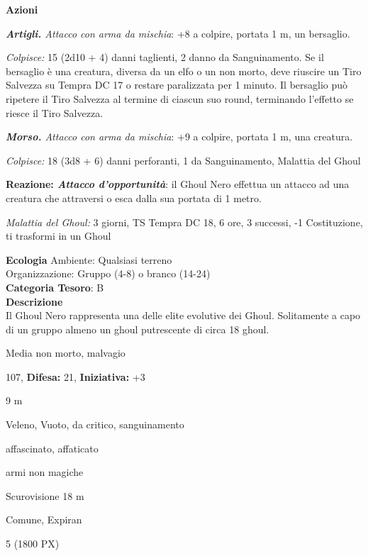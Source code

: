\begin{multicols}{2}
{\textbf{Azioni}

\emph{\textbf{Artigli.} Attacco con arma da mischia}: +8 a colpire, portata 1 m, un bersaglio.

\emph{Colpisce:} 15 (2d10 + 4) danni taglienti, 2 danno da Sanguinamento. Se il bersaglio è una creatura, diversa da un elfo o un non morto, deve riuscire un Tiro Salvezza su Tempra DC 17 o restare paralizzata per 1 minuto. Il bersaglio può ripetere il Tiro Salvezza al termine di ciascun suo round, terminando l'effetto se riesce il Tiro Salvezza.

\emph{\textbf{Morso.} Attacco con arma da mischia}: +9 a colpire, portata 1 m, una creatura.

\emph{Colpisce:} 18 (3d8 + 6) danni perforanti, 1 da Sanguinamento, Malattia del Ghoul

\textbf{Reazione: \emph{Attacco d'opportunità}}: il Ghoul Nero effettua un attacco ad una creatura che attraversi o esca dalla sua portata di 1 metro.

\emph{Malattia del Ghoul:} 3 giorni, TS Tempra DC 18, 6 ore, 3 successi, -1 Costituzione, ti trasformi in un Ghoul

\textbf{Ecologia}
Ambiente: Qualsiasi terreno\\
Organizzazione: Gruppo (4-8) o branco (14-24)\\
\textbf{Categoria Tesoro}: B\\
\textbf{Descrizione}\\
Il Ghoul Nero rappresenta una delle elite evolutive dei Ghoul. Solitamente a capo di un gruppo almeno un ghoul putrescente di circa 18 ghoul.


\noindent
\begin{description}[noitemsep, topsep=0pt, parsep=0pt, partopsep=0pt, leftmargin=0cm, labelwidth=2.2cm]
	\item[\textbf{Taglia/Tipo:}] Media non morto, malvagio
	\item[\textbf{Caratt.:}] 
	\item[\textbf{Punti Ferita:}] 107,  \textbf{Difesa:} 21,  \textbf{Iniziativa:} +3
	\item[\textbf{Movimento:}] 9 m
	\item[\textbf{Tiri Salvez.:}] 
	\item[\textbf{Imm. Danni:}] Veleno, Vuoto, da critico, sanguinamento
	\item[\textbf{Immunità:}] affascinato, affaticato
	\item[\textbf{Res. Danni:}] armi non magiche
	\item[\textbf{Sensi:}] Scurovisione 18 m
	\item[\textbf{Linguaggi:}] Comune, Expiran
	\item[\textbf{Sfida:}] 5 (1800 PX)\smallskip
\end{description}

}
\end{multicols}
